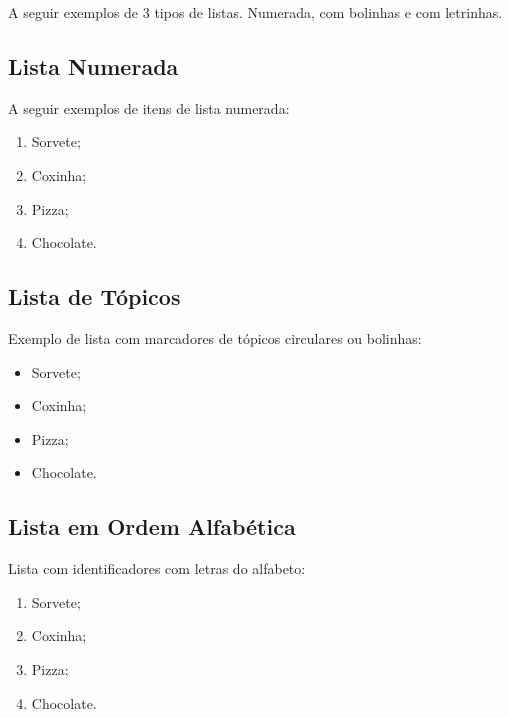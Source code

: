 A seguir exemplos de 3 tipos de listas. Numerada, com bolinhas e com letrinhas.

\subsection{Lista Numerada}

A seguir exemplos de itens de lista numerada:

\begin{enumerate}[leftmargin=1.7cm]
	\item Sorvete;
	
	\item Coxinha;
	
	\item Pizza;
	
	\item Chocolate.
\end{enumerate}

\subsection{Lista de Tópicos}

Exemplo de lista com marcadores de tópicos circulares ou bolinhas:

\begin{itemize}[leftmargin=1.7cm]
	\item Sorvete;
	
	\item Coxinha;
	
	\item Pizza;
	
	\item Chocolate.
\end{itemize}

\subsection{Lista em Ordem Alfabética}

Lista com identificadores com letras do alfabeto:

\begin{enumerate}[label=\alph*), leftmargin=1.7cm]
	
	\item Sorvete;
	
	\item Coxinha;
	
	\item Pizza;
	
	\item Chocolate.
	
\end{enumerate}

